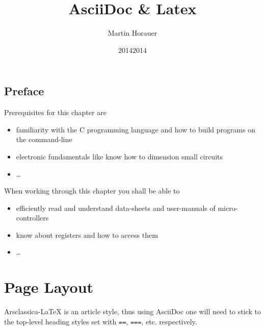 \documentclass[10pt,a4paper,oneside,BCOR5mm]{scrartcl}
\title{AsciiDoc \&{} Latex}
\author{Martin Horauer}
\date{2014}
\author{\spacedlowsmallcaps{Martin Horauer}}
\date{2014}
\begin{document}
\renewcommand{\sectionmark}[1]{\markright{\spacedlowsmallcaps{#1}}}
\lehead{\mbox{\llap{\small\thepage\kern1em\color{halfgray} \vline}\color{halfgray}\hspace{0.5em}\rightmark\hfil}}
\label{header}\hypertarget{header}{}
\maketitle
\setcounter{tocdepth}{2}
\tableofcontents

\hypertarget{_preface}{}
\section{Preface}
\label{_preface}
 \par\noindent{}Prerequisites for this chapter are
  \begin{itemize}
\item%
familiarity with the C programming language and how to build programs on the command-line

\item%
electronic fundamentals like know how to dimension small circuits

\item%
\dots{}

\end{itemize}
 \par\noindent{}When working through this chapter you shall be able to
  \begin{itemize}
\item%
efficiently read and understand data-sheets and user-manuals of micro-controllers

\item%
know about registers and how to access them

\item%
\dots{}

\end{itemize}
\hypertarget{_page_layout}{}
\chapter{Page Layout}
\label{_page_layout}
 \par\noindent{}Arsclassica-\LaTeX{} is an article style, thus using AsciiDoc one will need to stick to the top-level heading styles set with \texttt{==}, \texttt{===}, etc. respectively.
 \par\noindent{}
\hypertarget{_images_and_figures}{}
\end{document}

